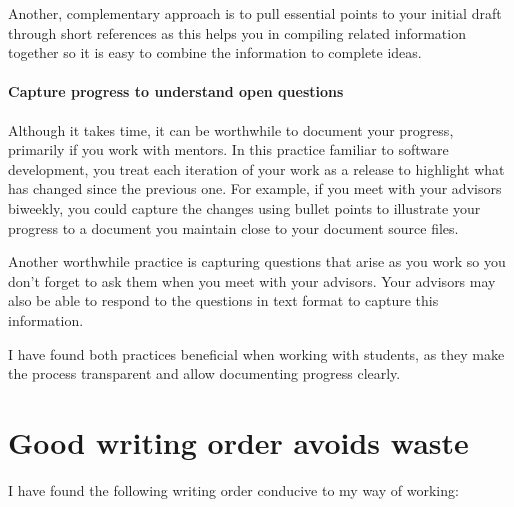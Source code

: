 Another, complementary approach is to pull essential points to your initial draft through short references as this helps you in compiling related information together so it is easy to combine the information to complete ideas.

\paragraph{Capture progress to understand open questions}

Although it takes time, it can be worthwhile to document your progress, primarily if you work with mentors.
In this practice familiar to software development, you treat each iteration of your work as a release to highlight what has changed since the previous one.
For example, if you meet with your advisors biweekly, you could capture the changes using bullet points to illustrate your progress to a document you maintain close to your document source files.

Another worthwhile practice is capturing questions that arise as you work so you don't forget to ask them when you meet with your advisors.
Your advisors may also be able to respond to the questions in text format to capture this information.

I have found both practices beneficial when working with students, as they make the process transparent and allow documenting progress clearly.

\section{Good writing order avoids waste}

I have found the following writing order conducive to my way of working:


